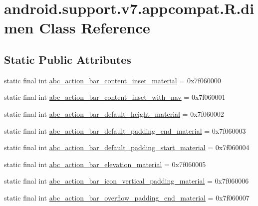 \hypertarget{classandroid_1_1support_1_1v7_1_1appcompat_1_1R_1_1dimen}{}\section{android.\+support.\+v7.\+appcompat.\+R.\+dimen Class Reference}
\label{classandroid_1_1support_1_1v7_1_1appcompat_1_1R_1_1dimen}
\subsection*{Static Public Attributes}
\begin{DoxyCompactItemize}
\item 
static final int \mbox{\hyperlink{classandroid_1_1support_1_1v7_1_1appcompat_1_1R_1_1dimen_a16b8f74d21224eeb5be3d887e9419862}{abc\+\_\+action\+\_\+bar\+\_\+content\+\_\+inset\+\_\+material}} = 0x7f060000
\item 
static final int \mbox{\hyperlink{classandroid_1_1support_1_1v7_1_1appcompat_1_1R_1_1dimen_a2a781b8c00eb2a75ab45622051168a8e}{abc\+\_\+action\+\_\+bar\+\_\+content\+\_\+inset\+\_\+with\+\_\+nav}} = 0x7f060001
\item 
static final int \mbox{\hyperlink{classandroid_1_1support_1_1v7_1_1appcompat_1_1R_1_1dimen_a8ce0c5f4f00b5744f6403f67c48cb4da}{abc\+\_\+action\+\_\+bar\+\_\+default\+\_\+height\+\_\+material}} = 0x7f060002
\item 
static final int \mbox{\hyperlink{classandroid_1_1support_1_1v7_1_1appcompat_1_1R_1_1dimen_a067da9abef12ba2f906b6080a5a912d0}{abc\+\_\+action\+\_\+bar\+\_\+default\+\_\+padding\+\_\+end\+\_\+material}} = 0x7f060003
\item 
static final int \mbox{\hyperlink{classandroid_1_1support_1_1v7_1_1appcompat_1_1R_1_1dimen_a993d714aa584cfe3ef4b3f91fd062aa2}{abc\+\_\+action\+\_\+bar\+\_\+default\+\_\+padding\+\_\+start\+\_\+material}} = 0x7f060004
\item 
static final int \mbox{\hyperlink{classandroid_1_1support_1_1v7_1_1appcompat_1_1R_1_1dimen_a859b78388dcdd04d0b3375283c0a5a0b}{abc\+\_\+action\+\_\+bar\+\_\+elevation\+\_\+material}} = 0x7f060005
\item 
static final int \mbox{\hyperlink{classandroid_1_1support_1_1v7_1_1appcompat_1_1R_1_1dimen_a4e148bb5abc8982092986153140c5645}{abc\+\_\+action\+\_\+bar\+\_\+icon\+\_\+vertical\+\_\+padding\+\_\+material}} = 0x7f060006
\item 
static final int \mbox{\hyperlink{classandroid_1_1support_1_1v7_1_1appcompat_1_1R_1_1dimen_a5a92c209ad6132c4236653fc2bef6f45}{abc\+\_\+action\+\_\+bar\+\_\+overflow\+\_\+padding\+\_\+end\+\_\+material}} = 0x7f060007

\end{DoxyCompactItemize}
